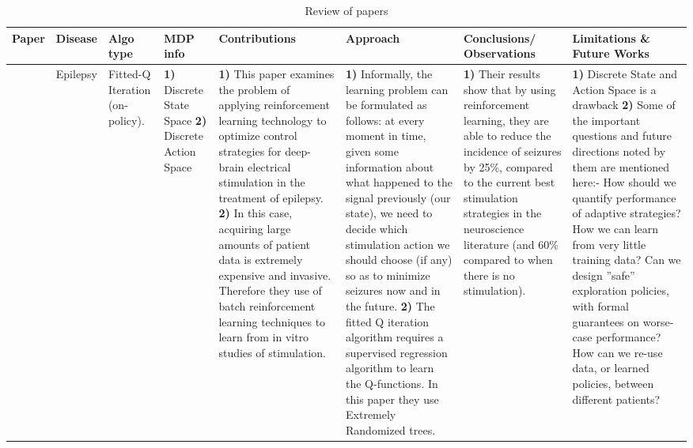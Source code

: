 \begin{table}[!th]
\caption{Review of papers}
\label{tab:review9}
\begin{tabular}{|p{3 em}|p{3 em}|p{3 em}|p{3em}|p{6em}|p{6em}|p{6 em}|p{9em}|}
\toprule
Paper  & Disease  & Algo type & MDP info & Contributions  & Approach & Conclusions/ Observations  & Limitations \& Future Works \\
\hline
\citet{DBLP:conf/aaai/GuezVAP08} & Epilepsy
& 
Fitted-Q Iteration (on-policy).
& 
\textbf{1)} Discrete State Space 
\textbf{2)} Discrete Action Space 
&  
\textbf{1)} This paper examines the problem of applying reinforcement
learning technology to optimize control strategies for
deep-brain electrical stimulation in the treatment of epilepsy. \textbf{2)}
In this case, acquiring large amounts of patient data is extremely
expensive and invasive. Therefore they use of batch reinforcement learning techniques
to learn from in vitro studies of stimulation. 
&
\textbf{1)} Informally, the learning problem can be formulated as
follows: at every moment in time, given some information
about what happened to the signal previously (our state), we
need to decide which stimulation action we should choose
(if any) so as to minimize seizures now and in the future. \textbf{2)} The fitted Q iteration algorithm requires a supervised regression algorithm to learn the Q-functions. In this paper they use Extremely Randomized trees.
& 
\textbf{1)} Their results show that by using reinforcement
learning, they are able to reduce the incidence of seizures
by 25\%, compared to the current best stimulation strategies
in the neuroscience literature (and 60\% compared to when
there is no stimulation).
& 
\textbf{1)}  Discrete State and Action Space is a drawback
\textbf{2)} Some of the important questions and future directions noted  by them are mentioned here:- How should we quantify performance
of adaptive strategies? How we can learn from very
little training data? Can we design ”safe” exploration policies,
with formal guarantees on worse-case performance?
How can we re-use data, or learned policies, between different
patients? 
   \\\midrule
\end{tabular}
\vspace*{-2em}
\end{table}   

